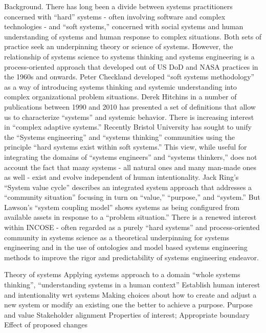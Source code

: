 Background. There has long been a divide between systems practitioners concerned with ``hard'' systems - often involving software and complex technologies - and ``soft systems,'' concerned with social systems and human understanding of systems and human response to complex situations. Both sets of practice seek an underpinning theory or science of systems. However, the relationship of systems science to systems thinking and systems engineering is a process-oriented approach that developed out of US DoD and NASA practices in the 1960s and onwards. Peter Checkland developed ``soft systems methodology'' as a way of introducing systems thinking and systemic understanding into complex organizational problem situations. Derek Hitchins in a number of publications between 1990 and 2010 has presented a set of definitions that allow us to characterize ``systems'' and systemic behavior. There is increasing interest in ``complex adaptive systems.'' Recently Bristol University has sought to unify the ``Systems engineering'' and ``systems thinking'' communities using the principle ``hard systems exist within soft systems.'' This view, while useful for integrating the domains of ``systems engineers'' and ``systems thinkers,'' does not account the fact that many systems - all natural ones and many man-made ones as well - exist and evolve independent of human intentionality. Jack Ring’s ``System value cycle'' describes an integrated system approach that addresses a “community situation” focusing in turn on ``value,'' ``purpose,'' and ``system.'' But Lawson’s ``system coupling model'' shows systems as being configured from available assets in response to a ``problem situation.'' There is a renewed interest within INCOSE - often regarded as a purely ``hard systems'' and process-oriented community in systems science as a theoretical underpinning for systems engineering and in the use of ontologies and model based systems engineering methods to improve the rigor and predictability of systems engineering endeavor.

Theory of systems
Applying systems approach to a domain
“whole systems thinking”, “understanding systems in a human context”
Establish human interest and intentionality wrt systems
Making choices about how to create and adjust a new system or modify an existing one the better to achieve a purpose.
Purpose and value
Stakeholder alignment
Properties of interest;
Appropriate boundary
Effect of proposed changes

